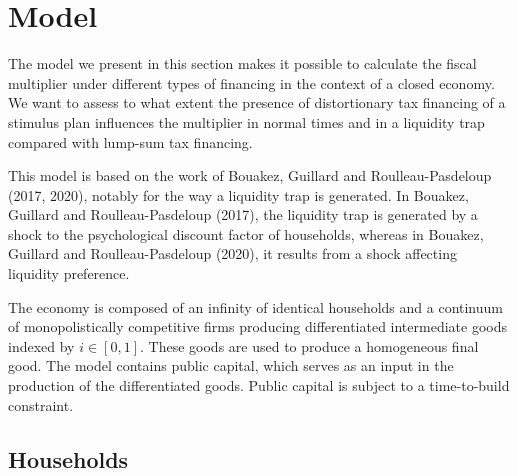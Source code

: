 \documentclass[12pt,letterpaper]{article}
\begin{document}
\section{Model}

The model we present in this section makes it possible to calculate the fiscal multiplier under different types of financing in the context of a closed economy. We want to assess to what extent the presence of distortionary tax financing of a stimulus plan influences the multiplier in normal times and in a liquidity trap compared with lump-sum tax financing.

This model is based on the work of Bouakez, Guillard and Roulleau-Pasdeloup (2017, 2020), notably for the way a liquidity trap is generated. In Bouakez, Guillard and Roulleau-Pasdeloup (2017), the liquidity trap is generated by a shock to the psychological discount factor of households, whereas in Bouakez, Guillard and Roulleau-Pasdeloup (2020), it results from a shock affecting liquidity preference.

The economy is composed of an infinity of identical households and a continuum of monopolistically competitive firms producing differentiated intermediate goods indexed by $i \in [0,1]$. These goods are used to produce a homogeneous final good. The model contains public capital, which serves as an input in the production of the differentiated goods. Public capital is subject to a time-to-build constraint.

\subsection{Households}
\end{document}
